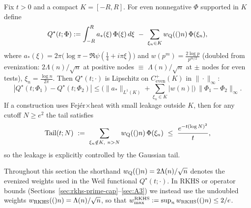 \begin{lemma}[A2]\label{a2:lem:A2}
Fix $t>0$ and a compact $K=[-R,R]$. For even nonnegative $\Phi$ supported in $K$ define
\begin{equation}\label{eq:A2_continuity_Q-q-functional}
Q^\star(t;\Phi) := \int_{-R}^{R} a_*(\xi)\,\Phi(\xi)\,d\xi\ -\ \sum_{\xi_n\in K} \wQ(n)\, \Phi(\xi_n),
\end{equation}
where $a_*(\xi)=2\pi\bigl(\log\pi-\Re\psi(\tfrac14+i\pi\xi)\bigr)$ and $w(p^m)=\tfrac{2\log p}{p^{m/2}}$ (doubled from evenization: $2\Lambda(n)/\sqrt n$ at positive nodes $\equiv$ $\Lambda(n)/\sqrt n$ at $\pm$ nodes for even tests), $\xi_n=\tfrac{\log n}{2\pi}$. Then $Q^\star(t;\cdot)$ is Lipschitz on $C^+_{\mathrm{even}}(K)$ in $\|\cdot\|_\infty$:
\begin{equation}\label{eq:A2_continuity_Q-q-functional-2}
|Q^\star(t;\Phi_1)-Q^\star(t;\Phi_2)| \le \Big(\|a_*\|_{L^1(K)} + \sum_{\xi_n\in K} |w(n)|\Big)\, \|\Phi_1-\Phi_2\|_\infty.
\end{equation}
If a construction uses Fej\'er$\times$heat with small leakage outside $K$, then for any cutoff $N\ge e^2$ the tail satisfies
\begin{equation}\label{eq:A2_continuity_Q-formula-4}
\mathrm{Tail}(t;N)\ :=\ \sum_{\xi_n\notin K,\ n>N} w_{\mathrm{Q}}(()n)\,\Phi(\xi_n)\ \le\ \frac{e^{-t (\log N)^2}}{t},
\end{equation}
so the leakage is explicitly controlled by the Gaussian tail.
\end{lemma}
\begin{remark}
Throughout this section the shorthand $w_{\mathrm{Q}}(()n)=2\Lambda(n)/\sqrt n$ denotes the evenized weights used in the Weil functional $Q^\star(t;\cdot)$. In RKHS or operator bounds (Sections~\ref{sec:rkhs-prime-cap}--\ref{sec:A3}) we instead use the undoubled weights $w_{\mathrm{RKHS}}(()n)=\Lambda(n)/\sqrt n$, so that $w_{\max}^{\mathrm{RKHS}}:=\sup_n w_{\mathrm{RKHS}}(()n)\le 2/e$.
\end{remark}

